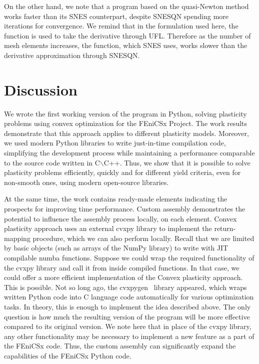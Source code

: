 \documentclass[12pt]{article}
\begin{document}
On the other hand, we note that a program based on the quasi-Newton method works faster than its SNES counterpart, despite SNESQN spending more iterations for convergence. We remind that in the formulation used here, the  function is used to take the derivative through UFL. Therefore as the number of mesh elements increases, the  function, which SNES uses, works slower than the derivative approximation through SNESQN.

\newpage
\section{Discussion}
\label{sec:discussion}

We wrote the first working version of the program in Python, solving plasticity problems using convex optimization for the FEniCSx Project. The work results demonstrate that this approach applies to different plasticity models. Moreover, we used modern Python libraries to write just-in-time compilation code, simplifying the development process while maintaining a performance comparable to the source code written in C$\backslash$C++. Thus, we show that it is possible to solve plasticity problems efficiently, quickly and for different yield criteria, even for non-smooth ones, using modern open-source libraries. 

At the same time, the work contains ready-made elements indicating the prospects for improving time performance. Custom assembly demonstrates the potential to influence the assembly process locally, on each element. Convex plasticity approach uses an external cvxpy library to implement the return-mapping procedure, which we can also perform locally. Recall that we are limited by basic objects (such as arrays of the NumPy library) to write with JIT compilable numba functions. Suppose we could wrap the required functionality of the cvxpy library and call it from inside compiled functions. In that case, we could offer a more efficient implementation of the Convex plasticity approach. This is possible. Not so long ago, the cvxpygen~\parencite{cvxpygen2022} library appeared, which wraps written Python code into C language code automatically for various optimization tasks. In theory, this is enough to implement the idea described above. The only question is how much the resulting version of the program will be more effective compared to its original version. We note here that in place of the cvxpy library, any other functionality may be necessary to implement a new feature as a part of the FEniCSx code. Thus, the custom assembly can significantly expand the capabilities of the FEniCSx Python code.
\end{document}
